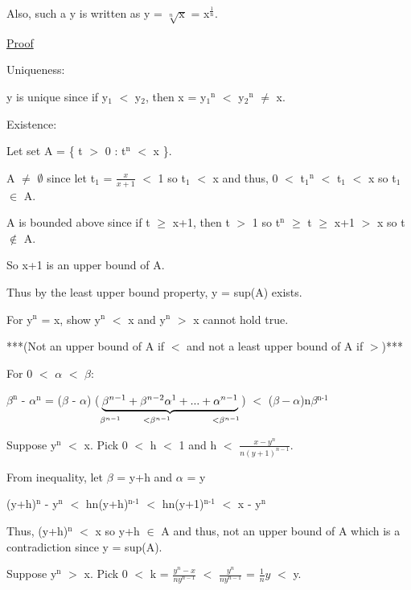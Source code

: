 	\qquad Also, such a y is written as y = $\sqrt[n]{\text{x}}$ = x$^{\frac{1}{\text{n}}}$.

{ \color{magenta} \underline{Proof} } 

	{ \color{lblue} Uniqueness: }

	y is unique since if y$_{1}$ $<$ y$_{2}$, then
	x = y$_{1}$$^\text{n}$ $<$ y$_{2}$$^\text{n}$ $\neq$ x.

	{ \color{lblue} Existence: }

	Let set A = \{ t $>$ 0 : t$^\text{n}$ $<$ x \}.

	A $\not =$ $\emptyset$ since let t$_{1}$ = $\frac{x}{x+1}$ $<$ 1 so t$_1$ $<$ x
	and thus, 0 $<$ t$_{1}$$^\text{n}$ $<$ t$_{1}$ $<$ x so t$_{1}$ $\in$ A.

	A is bounded above since if t $ \geq $ x+1, then
	t $>$ 1 so t$^\text{n}$ $ \geq $ t $ \geq $ x+1 $>$ x so t $\not \in$ A.

	So x+1 is an upper bound of A.

	Thus by the least upper bound property, y = sup(A) exists.

	For y$^\text{n}$ = x, show y$^\text{n}$ $<$ x and y$^\text{n}$ $>$ x cannot hold true.

	***(Not an upper bound of A if $<$ and not a least upper bound of A if $>$)***

	For 0 $<$ $\alpha$ $<$ $\beta$:

	\qquad $\beta ^\text{n}$ - $\alpha^\text{n}$
	= ($\beta$ - $\alpha$) ($\underbrace{\beta^{n-1} + \beta^{n-2}\alpha^1 + ... + \alpha^{n-1}}
	_{\beta^{n-1} \hspace{0.7cm} <\beta^{n-1} \hspace{1.3cm} <\beta^{n-1}}$)
	$<$ ($\beta - \alpha$)n$\beta$$^\text{n-1}$ 

	Suppose y$^\text{n}$ $<$ x. Pick 0 $<$ h $<$ 1 and h $<$ $\frac{x-y^n}{n(y+1)^{n-1}}$.

	\qquad From inequality, let $\beta$ = y+h and $\alpha$ = y

	\qquad \qquad (y+h)$^\text{n}$ - y$^\text{n}$ $<$ hn(y+h)$^\text{n-1}$
	$<$ hn(y+1)$^\text{n-1}$ $<$ x - y$^\text{n}$

	\begin{adjustbox}{minipage=14.2cm, right}
		Thus, (y+h)$^\text{n}$ $<$ x so y+h $\in$ A and thus, not an upper bound of A
		which is a contradiction since y = sup(A).
	\end{adjustbox}

	Suppose y$^\text{n}$ $>$ x.
	Pick 0 $<$ k = $\frac{y^n - x}{ny^{n-1}}$ $<$ $\frac{y^n}{ny^{n-1}}$
	= $\frac{1}{n}y$ $<$ y.


